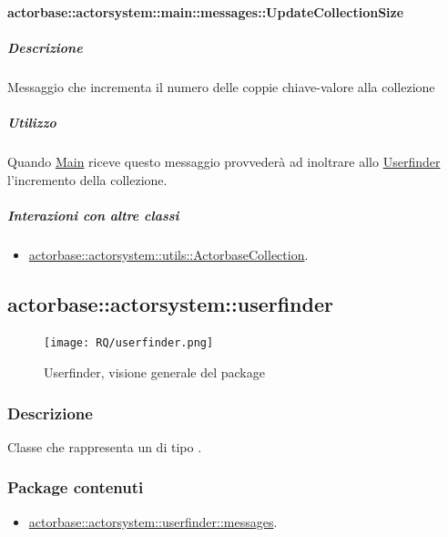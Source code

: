 \documentclass{scalatekids-article}
\begin{document}
\paragraph{actorbase::actorsystem::main::messages::UpdateCollectionSize}
\label{sec:actorbase::actorsystem::main::messages::UpdateCollectionSize}

\subparagraph{Descrizione}

Messaggio che incrementa il numero delle coppie chiave-valore alla collezione

\subparagraph{Utilizzo}

Quando \hyperref[sec:actorbase::actorsystem::main::Main]{Main}
riceve questo messaggio provvederà ad inoltrare allo \hyperref[sec:actorbase::actorsystem::userfinder::Userfinder]{Userfinder} l'incremento della collezione.

\subparagraph{Interazioni con altre classi}
\begin{itemize}
\item \hyperref[sec:actorbase::actorsystem::utils::ActorbaseCollection]{actorbase::actorsystem::utils::ActorbaseCollection}.
\end{itemize}


\subsection{actorbase::actorsystem::userfinder} %
\label{sec:actorbase::actorsystem::userfinder}

\begin{figure}[H]
  \begin{center}
    \texttt{[image: RQ/userfinder.png]}
    \caption{Userfinder, visione generale del package}
  \end{center}
\end{figure}

\subsubsection{Descrizione}
Classe che rappresenta un  di tipo .

\subsubsection{Package contenuti}
\begin{itemize}
\item \hyperref[sec:actorbase::actorsystem::userfinder::messages]{actorbase::actorsystem::userfinder::messages}.
\end{itemize}
\end{document}
